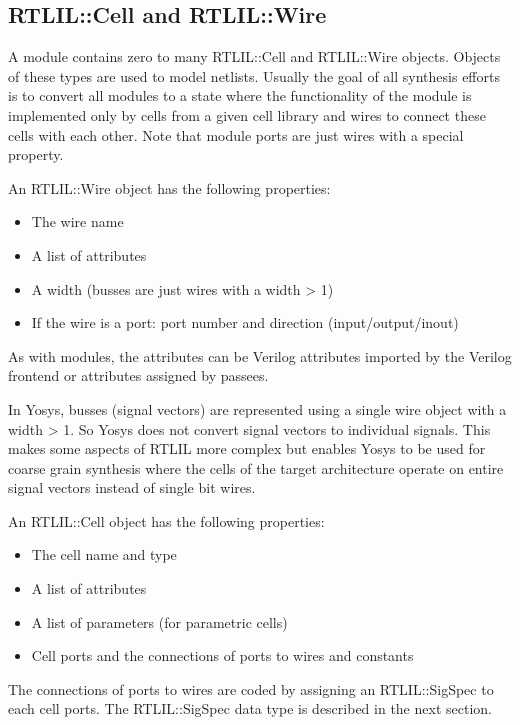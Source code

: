 \subsection{RTLIL::Cell and RTLIL::Wire}

A module contains zero to many RTLIL::Cell and RTLIL::Wire objects. Objects of
these types are used to model netlists. Usually the goal of all synthesis efforts is to convert
all modules to a state where the functionality of the module is implemented only by cells
from a given cell library and wires to connect these cells with each other. Note that module
ports are just wires with a special property.

An RTLIL::Wire object has the following properties:

\begin{itemize}
\item The wire name
\item A list of attributes
\item A width (busses are just wires with a width > 1)
\item If the wire is a port: port number and direction (input/output/inout)
\end{itemize}

As with modules, the attributes can be Verilog attributes imported by the
Verilog frontend or attributes assigned by passees.

In Yosys, busses (signal vectors) are represented using a single wire object
with a width > 1. So Yosys does not convert signal vectors to individual signals.
This makes some aspects of RTLIL more complex but enables Yosys to be used for
coarse grain synthesis where the cells of the target architecture operate on
entire signal vectors instead of single bit wires.

An RTLIL::Cell object has the following properties:

\begin{itemize}
\item The cell name and type
\item A list of attributes
\item A list of parameters (for parametric cells)
\item Cell ports and the connections of ports to wires and constants
\end{itemize}

The connections of ports to wires are coded by assigning an RTLIL::SigSpec
to each cell ports. The RTLIL::SigSpec data type is described in the next section.

